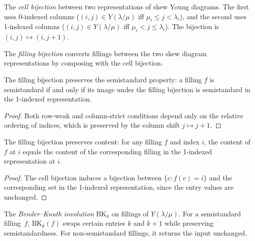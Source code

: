 \begin{definition}
\label{def.sf.skew-cell-equiv}
\leanhelper
\leanok
The \emph{cell bijection} between two representations of skew Young diagrams.
The first uses 0-indexed columns ($(i,j) \in Y(\lambda/\mu)$ iff $\mu_i \le j < \lambda_i$),
and the second uses 1-indexed columns ($(i,j) \in Y(\lambda/\mu)$ iff $\mu_i < j \le \lambda_i$).
The bijection is $(i, j) \mapsto (i, j+1)$.
\end{definition}

\begin{definition}
\label{def.sf.skew-filling-equiv}
\leanhelper
\leanok
The \emph{filling bijection} converts fillings between the two skew diagram
representations by composing with the cell bijection.
\end{definition}

\begin{lemma}
\label{lem.sf.skew-filling-equiv-ssyt}
\leanhelper
\leanok
The filling bijection preserves the semistandard property:
a filling $f$ is semistandard if and only if its image under
the filling bijection is semistandard in the 1-indexed representation.
\end{lemma}

\begin{proof}
\leanok
Both row-weak and column-strict conditions depend only on the relative ordering
of indices, which is preserved by the column shift $j \mapsto j+1$.
\end{proof}

\begin{lemma}
\label{lem.sf.skew-filling-equiv-content}
\leanhelper
\leanok
The filling bijection preserves content: for any filling $f$ and index $i$,
the content of $f$ at $i$ equals the content of the corresponding filling
in the 1-indexed representation at $i$.
\end{lemma}

\begin{proof}
\leanok
The cell bijection induces a bijection between
$\{c : f(c) = i\}$ and the corresponding set in the 1-indexed representation,
since the entry values are unchanged.
\end{proof}

\begin{definition}
\label{def.sf.bk-invol}
\leanhelper
\leanok
The \emph{Bender--Knuth involution} $\mathrm{BK}_k$ on fillings of $Y(\lambda/\mu)$.
For a semistandard filling~$f$, $\mathrm{BK}_k(f)$ swaps certain entries $k$ and $k{+}1$
while preserving semistandardness.
For non-semistandard fillings, it returns the input unchanged.
\end{definition}

